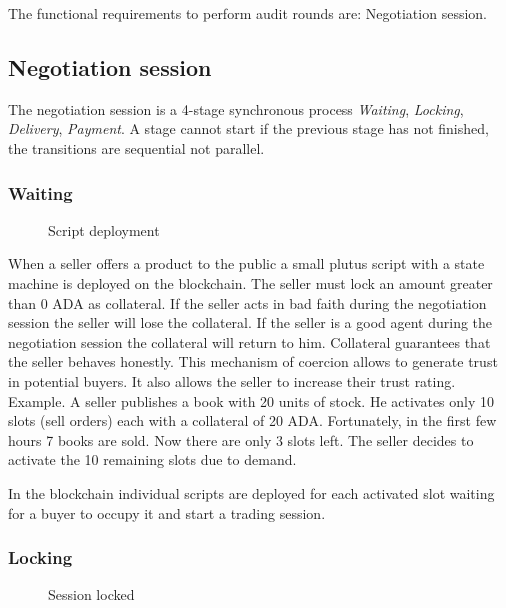 \documentclass[12pt]{article}
\begin{document}
The functional requirements to perform audit rounds are: Negotiation session.

\subsection { Negotiation session }

The negotiation session is a 4-stage synchronous process \emph{Waiting}, \emph{Locking}, \emph{Delivery}, \emph{Payment}. A stage cannot start if the previous stage has not finished, the transitions are sequential not parallel.

\subsubsection { Waiting }

\begin{figure}[ht]
  \centering
  
  \caption{Script deployment}
  \label{fig:mi_imagen}
\end{figure}


When a seller offers a product to the public a small plutus script with a state machine is deployed on the blockchain.
The seller must lock an amount greater than 0 ADA as collateral. 
If the seller acts in bad faith during the negotiation session the seller will lose the collateral.
If the seller is a good agent during the negotiation session the collateral will return to him.
Collateral guarantees that the seller behaves honestly.
This mechanism of coercion allows to generate trust in potential buyers. 
It also allows the seller to increase their trust rating.
Example. A seller publishes a book with 20 units of stock.
He activates only 10 slots (sell orders) each with a collateral of 20 ADA.
Fortunately, in the first few hours 7 books are sold. Now there are only 3 slots left.
The seller decides to activate the 10 remaining slots due to demand.

In the blockchain individual scripts are deployed for each activated slot waiting for a buyer to occupy it and start a trading session.

\subsubsection { Locking }

\begin{figure}[ht]
  \centering
  
  \caption{Session locked}
  \label{fig:locking}
\end{figure}
\end{document}
